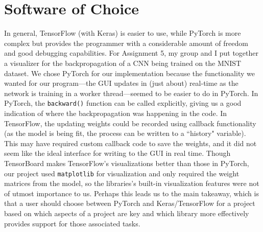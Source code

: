 \documentclass[conference]{IEEEtran}
\begin{document}
\section{Software of Choice}
In general, TensorFlow (with Keras) is easier to use, while PyTorch is more complex but provides the programmer with a considerable amount of freedom and good debugging capabilities. For Assignment 5, my group and I put together a visualizer for the backpropagation of a CNN being trained on the MNIST dataset. We chose PyTorch for our implementation because the functionality we wanted for our program---the GUI updates in (just about) real-time as the network is training in a worker thread---seemed to be easier to do in PyTorch. In PyTorch, the \verb+backward()+ function can be called explicitly, giving us a good indication of where the backpropagation was happening in the code. In TensorFlow, the updating weights could be recorded using callback functionality (as the model is being fit, the process can be written to a ``history" variable). This may have required custom callback code to save the weights, and it did not seem like the ideal interface for writing to the GUI in real time. Though TensorBoard makes TensorFlow's visualizations better than those in PyTorch, our project used \verb+matplotlib+ for visualization and only required the weight matrices from the model, so the libraries's built-in visualization features were not of utmost importance to us. \cite{Terra} Perhaps this leads us to the main takeaway, which is that a user should choose between PyTorch and Keras/TensorFlow for a project based on which aspects of a project are key and which library more effectively provides support for those associated tasks. 

\end{document}
